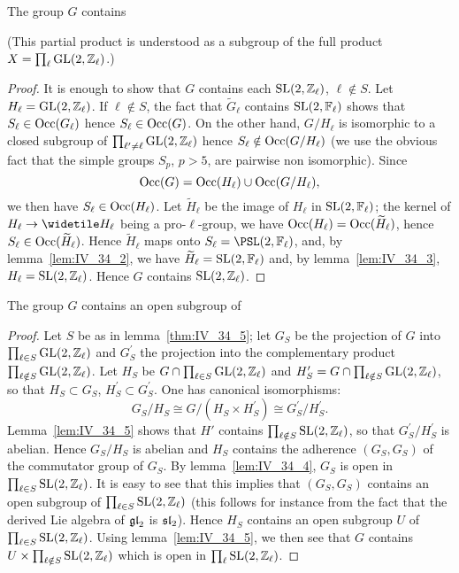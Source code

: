 \begin{lem}\label{thm:IV_34_5}
	The group $G$ contains 
\end{lem}
(This partial product is understood as a subgroup of the full product $X =
\prod_\ell \operatorname{GL}(2,\mathbb{Z}_\ell)$.)
\begin{proof}
	It is enough to show that $G$ contains each $\operatorname{SL}(2, \mathbb{Z}_\ell)$, $\ell
	\notin S$.  Let $H_\ell = \operatorname{GL}(2, \mathbb{Z}_\ell)$. If $\ell \notin S$, the
	fact that $\widetilde{G}_\ell$ contains $\operatorname{SL}(2, \mathbb{F}_\ell)$ shows that
	$S_\ell \in \operatorname{Occ}(G_\ell)$ hence $S_\ell \in \operatorname{Occ}(G)$. On the other
	hand, $G/H_\ell$ is isomorphic to a closed subgroup of
	$\prod_{\ell'\ne\ell} \operatorname{GL}(2, \mathbb{Z}_\ell)$ hence $S_\ell \notin
	\operatorname{Occ}(G/H_\ell)$ (we use the obvious fact that the simple groups $S_p$,
	$p > 5$, are pairwise non isomorphic). Since
	\[
		\operatorname{Occ}(G) = \operatorname{Occ}(H_\ell) \cup \operatorname{Occ}(G/H_\ell),
	\]
	we then have $S_\ell \in \operatorname{Occ}(H_\ell)$. Let $\widetilde{H}_\ell$ be the
	image of $H_\ell$ in $\operatorname{SL}(2, \mathbb{F}_\ell)$; the kernel of $H_\ell \to
	\widetile H_\ell$ being a pro-$\ell$-group, we have $\operatorname{Occ}(H_\ell) =
	\operatorname{Occ}(\widetilde H_\ell)$, hence $S_\ell \in \operatorname{Occ}(\widetilde H_\ell)$.
	Hence $\widetilde H_\ell$ maps onto $S_\ell = \PSL(2,\F_\ell)$, and, by
	lemma~\ref{lem:IV_34_2}, we have $\widetilde H_\ell = \operatorname{SL}(2, \mathbb{F}_\ell)$
	and, by lemma~\ref{lem:IV_34_3}, $H_\ell = \operatorname{SL}(2, \mathbb{Z}_\ell)$. Hence $G$
	contains $\operatorname{SL}(2, \mathbb{Z}_\ell)$.
\end{proof}

\begin{lem}\label{lem:IV_34_6}
	The group $G$ contains an open subgroup of
\end{lem}
\begin{proof}
	Let $S$ be as in lemma~\ref{thm:IV_34_5}; let $G_S$ be the projection
	of $G$ into $\prod_{\ell\in S} \operatorname{GL}(2, \mathbb{Z}_\ell)$ and $G^\prime_S$ the
	projection into the complementary product $\prod_{\ell\notin S} \operatorname{GL}(2,
	\mathbb{Z}_\ell)$. Let $H_S$ be $G \cap \prod_{\ell\in S} \operatorname{GL}(2, \mathbb{Z}_\ell)$ and
	$H^\prime_S = G \cap \prod_{\ell\notin S} \operatorname{GL}(2, \mathbb{Z}_\ell)$, so that
	$H_S \subset G_S$, $H^\prime_S \subset G^\prime_S$. One has canonical
	isomorphisms:
	\dpage
	\[
		G_S/H_S \cong G/(H_S \times H_S^\prime) \cong
		G_S^\prime/H_S^\prime.
	\]
	Lemma~\ref{lem:IV_34_5} shows that $H'$ contains $\prod_{\ell\notin S}
	\operatorname{SL}(2, \mathbb{Z}_\ell)$, so that $G_S^\prime/H_S^\prime$ is abelian. Hence
	$G_S/H_S$ is abelian and $H_S$ contains the adherence $(G_S, G_S)$ of
	the commutator group of $G_S$. By lemma~\ref{lem:IV_34_4}, $G_S$ is
	open in $\prod_{\ell\in S} \operatorname{SL}(2, \mathbb{Z}_\ell)$. It is easy to see that
	this implies that $(G_S, G_S)$ contains an open subgroup of
	$\prod_{\ell\in S} \operatorname{SL}(2, \mathbb{Z}_\ell)$ (this follows for instance from the
	fact that the derived Lie algebra of $\operatorname{\mathfrak{gl}}_2$ is $\operatorname{\mathfrak{sl}}_2$). Hence $H_S$
	contains an open subgroup $U$ of $\prod_{\ell\in S} \operatorname{SL}(2, \mathbb{Z}_\ell)$.
	Using lemma~\ref{lem:IV_34_5}, we then see that $G$ contains $U \times
	\prod_{\ell\notin S} \operatorname{SL}(2, \mathbb{Z}_\ell)$ which is open in $\prod_\ell
	\operatorname{SL}(2, \mathbb{Z}_\ell)$.
\end{proof}

